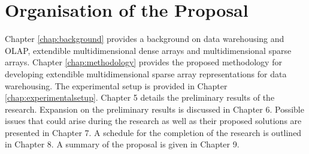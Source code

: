 \section{Organisation of the Proposal}%
Chapter \ref{chap:background} provides a background on data warehousing and OLAP, extendible multidimensional dense arrays and multidimensional sparse arrays. Chapter \ref{chap:methodology} provides the proposed methodology for developing extendible multidimensional sparse array representations for data warehousing. The experimental setup is provided in Chapter \ref{chap:experimentalsetup}. Chapter 5 details the preliminary results of the research. Expansion on the preliminary results is discussed in Chapter 6. Possible issues that could arise during the research as well as their proposed solutions are presented in Chapter 7. A schedule for the completion of the research is outlined in Chapter 8. A summary of the proposal is given in Chapter 9. 